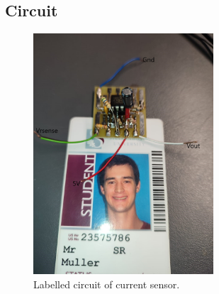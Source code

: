 \subsection{Circuit}
\begin{figure}[H]
\centering
\includegraphics[width = 0.6\textwidth]{./Figures/Cursens_Cir_Card.jpeg}
\caption{Labelled circuit of current sensor.}
\label{fig:cursen_cir_card}
\end{figure}

